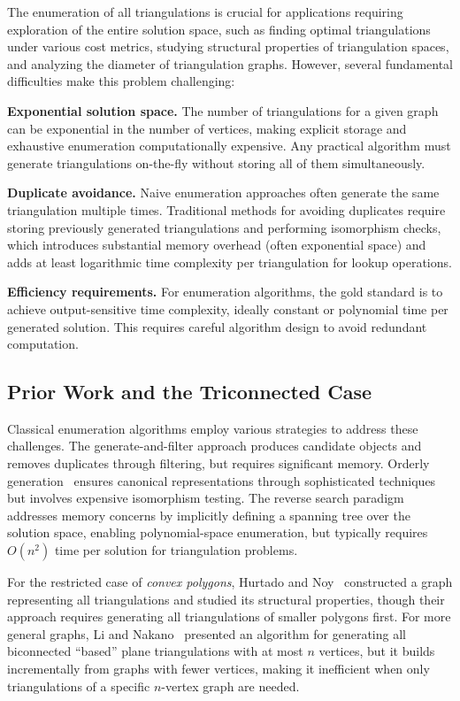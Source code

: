 \documentclass[12pt,a4paper]{article}
\theoremstyle{definition}
\theoremstyle{remark}
\begin{document}
The enumeration of all triangulations is crucial for applications requiring exploration of the entire solution space, such as finding optimal triangulations under various cost metrics, studying structural properties of triangulation spaces, and analyzing the diameter of triangulation graphs. However, several fundamental difficulties make this problem challenging:

\textbf{Exponential solution space.} The number of triangulations for a given graph can be exponential in the number of vertices, making explicit storage and exhaustive enumeration computationally expensive. Any practical algorithm must generate triangulations on-the-fly without storing all of them simultaneously.

\textbf{Duplicate avoidance.} Naive enumeration approaches often generate the same triangulation multiple times. Traditional methods for avoiding duplicates require storing previously generated triangulations and performing isomorphism checks, which introduces substantial memory overhead (often exponential space) and adds at least logarithmic time complexity per triangulation for lookup operations.

\textbf{Efficiency requirements.} For enumeration algorithms, the gold standard is to achieve output-sensitive time complexity, ideally constant or polynomial time per generated solution. This requires careful algorithm design to avoid redundant computation.

\subsection{Prior Work and the Triconnected Case}

Classical enumeration algorithms employ various strategies to address these challenges. The generate-and-filter approach produces candidate objects and removes duplicates through filtering, but requires significant memory. Orderly generation~\cite{read1978} ensures canonical representations through sophisticated techniques but involves expensive isomorphism testing. The reverse search paradigm~\cite{avis1996} addresses memory concerns by implicitly defining a spanning tree over the solution space, enabling polynomial-space enumeration, but typically requires $O(n^2)$ time per solution for triangulation problems.

For the restricted case of \emph{convex polygons}, Hurtado and Noy~\cite{hurtado1999} constructed a graph representing all triangulations and studied its structural properties, though their approach requires generating all triangulations of smaller polygons first. For more general graphs, Li and Nakano~\cite{li2001} presented an algorithm for generating all biconnected ``based'' plane triangulations with at most $n$ vertices, but it builds incrementally from graphs with fewer vertices, making it inefficient when only triangulations of a specific $n$-vertex graph are needed.
\end{document}
